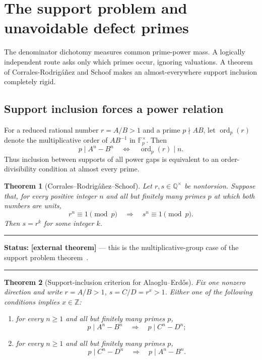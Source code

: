 \documentclass[11pt,oneside]{article}
\newtheorem{theorem}{Theorem}[section]
\theoremstyle{definition}
\theoremstyle{remark}
\newcommand{\Z}{\mathbb Z}
\newcommand{\Q}{\mathbb Q}
\newcommand{\ord}{\operatorname{ord}}
\newcommand{\AEconj}{Alaoglu--Erd\H{o}s}
\newcommand{\statusexternal}{\textcolor{deepblue}{\textbf{[external theorem]}}}
\newenvironment{statusbox}[1]
{\begin{center}\begin{minipage}{0.94\textwidth}\hrule\vspace{0.45em}\textbf{Status:} #1\par\vspace{0.35em}}
{\vspace{0.35em}\hrule\end{minipage}\end{center}}
\begin{document}
\section{The support problem and unavoidable defect primes}
\label{sec:support}

The denominator dichotomy measures common prime-power mass.  A logically independent route
asks only which primes occur, ignoring valuations.  A theorem of
Corrales-Rodrig\'a\~nez and Schoof makes an almost-everywhere support inclusion completely
rigid.

\subsection{Support inclusion forces a power relation}

For a reduced rational number $r=A/B>1$ and a prime $p\nmid AB$, let
$\ord_p(r)$ denote the multiplicative order of $AB^{-1}$ in $\mathbb F_p^\times$.  Then
\[
 p\mid A^n-B^n \quad\Longleftrightarrow\quad \ord_p(r)\mid n.
\]
Thus inclusion between supports of all power gaps is equivalent to an order-divisibility
condition at almost every prime.

\begin{theorem}[Corrales--Rodrig\'a\~nez--Schoof]
\label{thm:support-problem}
Let $r,s\in\Q^\times$ be nontorsion.  Suppose that, for every positive integer $n$ and all
but finitely many primes $p$ at which both numbers are units,
\[
 r^n\equiv1\pmod p \quad\Longrightarrow\quad s^n\equiv1\pmod p.
\]
Then $s=r^k$ for some integer $k$.
\end{theorem}

\begin{statusbox}{\statusexternal{} --- this is the multiplicative-group case of the
support problem theorem~\cite{CorralesSchoof1997}.}
\end{statusbox}

\begin{theorem}[Support-inclusion criterion for \AEconj]
\label{thm:support-AE}
Fix one nonzero direction and write $r=A/B>1$, $s=C/D=r^x>1$.  Either one of the following
conditions implies $x\in\Z$:
\begin{enumerate}[label=\textup{(\alph*)}]
\item for every $n\ge1$ and all but finitely many primes $p$,
\[
 p\mid A^n-B^n\quad\Longrightarrow\quad p\mid C^n-D^n;
\]
\item for every $n\ge1$ and all but finitely many primes $p$,
\[
 p\mid C^n-D^n\quad\Longrightarrow\quad p\mid A^n-B^n.
\]
\end{enumerate}
\end{theorem}
\end{document}
